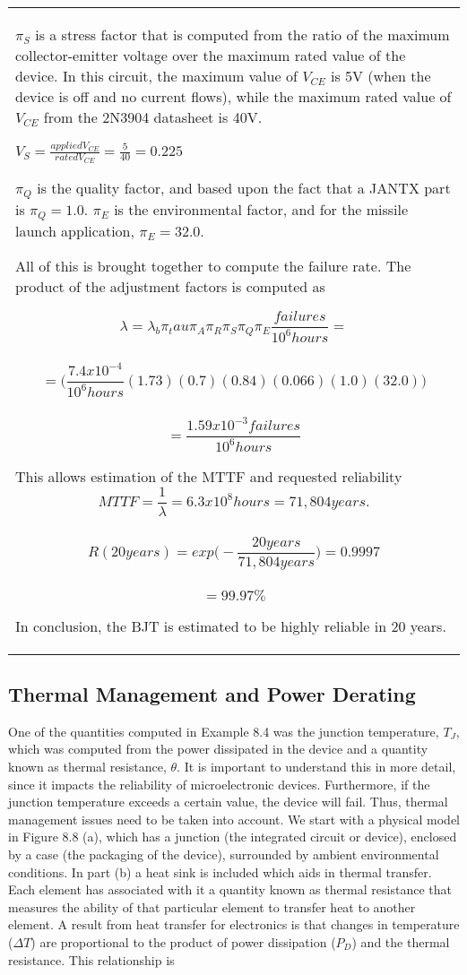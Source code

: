 {\begin{table}
\begin{tabular}{m{15cm}|}
$\pi_S$ is a stress factor that is
computed from the ratio of the maximum collector-emitter voltage over
the maximum rated value of the device. In this circuit, the maximum
value of $V_{CE}$ is 5V (when the device
is off and no current flows), while the maximum rated value of
$V_{CE}$ from the 2N3904 datasheet is 40V.

$V_S = \frac{applied V_{CE}}{rated V_{CE}} = \frac{5}{40} = 0.225$

$\pi_Q$ is the quality factor, and based upon the fact that a JANTX part is 
$\pi_Q = 1.0$.  $\pi_E$ is the environmental factor, and
for the missile launch application, $\pi_E = 32.0$.

All of this is brought together to compute the failure rate. The product
of the adjustment factors is computed as

$$\lambda=\lambda_b \pi_tau \pi_A \pi_R \pi_S \pi_Q \pi_E \frac{failures}{10^6 hours} = $$\\
$$	= \big( \frac{7.4x10^{-4}}{10^6 hours} (1.73)(0.7)(0.84)(0.066)(1.0)(32.0) \big) $$\\
$$	= \frac{1.59x10^{-3} failures}{10^6 hours}$$

This allows estimation of the MTTF and requested reliability
$$	MTTF = \frac{1}{\lambda} = 6.3x10^8 hours = 71,804 years. $$\\
$$	R(20 years) = exp \big( -\frac{20 years}{71,804 years} \big) = 0.9997 $$\\
$$	= 99.97\%$$

In conclusion, the BJT is estimated to be highly reliable in 20 years.

\end{tabular}
\end{table}



\subsection{Thermal Management and Power Derating}
\label{subsection:thermal-management-and-power-derating}

One of the quantities computed in Example 8.4 was the junction
temperature, $T_J$, which was computed from the
power dissipated in the device and a quantity known as thermal
resistance, $\theta$. It is important to understand this in more detail,
since it impacts the reliability of microelectronic devices.
Furthermore, if the junction temperature exceeds a certain value, the
device will fail. Thus, thermal management issues need to be taken into
account. We start with a physical model in Figure 8.8 (a), which has a
junction (the integrated circuit or device), enclosed by a case (the
packaging of the device), surrounded by ambient environmental
conditions. In part (b) a heat sink is included which aids in thermal
transfer. Each element has associated with it a quantity known as
thermal resistance that measures the ability of that particular element
to transfer heat to another element. A result from heat transfer for
electronics is that changes in temperature ($\Delta T$) are proportional
to the product of power dissipation ($P_D$) and the thermal resistance.
This relationship is

}
